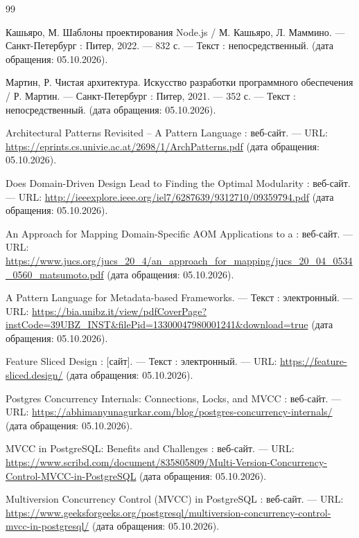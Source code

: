 \documentclass[a4paper,14pt]{extreport}
\begin{document}
\newpage

\begin{thebibliography}{99}

 Кашьяро, М. Шаблоны проектирования Node.js / М. Кашьяро, Л. Маммино. — Санкт-Петербург : Питер, 2022. — 832 с. — Текст : непосредственный. (дата обращения: 05.10.2026).

 Мартин, Р. Чистая архитектура. Искусство разработки программного обеспечения / Р. Мартин. — Санкт-Петербург : Питер, 2021. — 352 с. — Текст : непосредственный. (дата обращения: 05.10.2026).

 Architectural Patterns Revisited -- A Pattern Language : веб-сайт. --- URL: \url{https://eprints.cs.univie.ac.at/2698/1/ArchPatterns.pdf} (дата обращения: 05.10.2026).

 Does Domain-Driven Design Lead to Finding the Optimal Modularity : веб-сайт. --- URL: \url{http://ieeexplore.ieee.org/iel7/6287639/9312710/09359794.pdf} (дата обращения: 05.10.2026).

 An Approach for Mapping Domain-Specific AOM Applications to a : веб-сайт. --- URL: \url{https://www.jucs.org/jucs_20_4/an_approach_for_mapping/jucs_20_04_0534_0560_matsumoto.pdf} (дата обращения: 05.10.2026).

 A Pattern Language for Metadata-based Frameworks. — Текст : электронный. — URL: \url{https://bia.unibz.it/view/pdfCoverPage?instCode=39UBZ_INST&filePid=13300047980001241&download=true} (дата обращения: 05.10.2026).

 Feature Sliced Design : [сайт]. — Текст : электронный. — URL: \url{https://feature-sliced.design/} (дата обращения: 05.10.2026).

 Postgres Concurrency Internals: Connections, Locks, and MVCC : веб-сайт. --- URL: \url{https://abhimanyunagurkar.com/blog/postgres-concurrency-internals/} (дата обращения: 05.10.2026).

 MVCC in PostgreSQL: Benefits and Challenges : веб-сайт. --- URL: \url{https://www.scribd.com/document/835805809/Multi-Version-Concurrency-Control-MVCC-in-PostgreSQL} (дата обращения: 05.10.2026).

 Multiversion Concurrency Control (MVCC) in PostgreSQL : веб-сайт. --- URL: \url{https://www.geeksforgeeks.org/postgresql/multiversion-concurrency-control-mvcc-in-postgresql/} (дата обращения: 05.10.2026).


\end{thebibliography}
\end{document}
